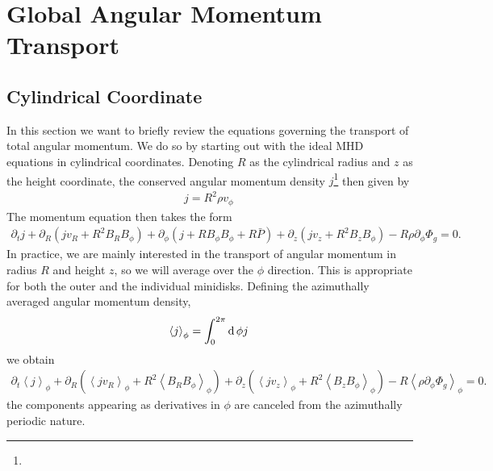 \documentclass[%
 reprint,
 superscriptaddress,
 amsmath,amssymb,
 nofootinbib,
 prd,
]{revtex4-2}
\newcommand{\hyw}[1]{{\color{red}{[{#1}]}}}
\begin{document}
\section{Global Angular Momentum Transport}
\label{app:amt}

\subsection{Cylindrical Coordinate}

In this section we want to briefly review the equations governing the transport of total angular momentum. We do so by starting out with the ideal MHD equations in cylindrical coordinates. Denoting %
$R$ as the cylindrical radius and $z$ as the height coordinate, the conserved angular momentum density $j$\footnote{\hyw{The specific angular momentum is $l=R v_\phi$. To have the conserved angular momentum in the radial direction, one need to do the integration along both azimuthal and vertical directions $\int R d\phi \int dz \rho l=\int d\phi \int dz (R^2 \rho v_\phi)$. So the conserved angular momentum current across different cylinders (having $R$ constant) has the form of $j=R^2 \rho v_\phi$}} then given by
\begin{align}
    j = R^2 \rho v_\phi\,
\end{align}
The momentum equation then takes the form
\begin{align}
    \partial_t j + \partial_R \left( j v_R + R^2 B_R B_\phi \right) + \partial_\phi \left( {j} + R B_\phi B_\phi + R \bar{P}\right) + \partial_z \left(j v_z  + R^2 B_z B_\phi\right) - R \rho \partial_\phi \Phi_g = 0.
\end{align}
In practice, we are mainly interested in the transport of angular momentum in radius $R$ and height $z$, so we will average over the $\phi$ direction. This is appropriate for both the outer and the individual minidisks.
Defining the azimuthally averaged angular momentum density,
\begin{align}
    \left<j\right>_\phi = \int_0^{2\pi}{\rm d}\, \phi j\,
\end{align}
we obtain
\begin{align}
\partial_t \left<j\right>_\phi + \partial_R \left( \left<j v_R \right>_\phi + R^2 \left<B_R B_\phi\right>_\phi \right) + \partial_z \left(\left< j v_z \right>_\phi + R^2 \left<B_z B_\phi \right>_\phi \right) - R \left<\rho \partial_\phi \Phi_g\right>_\phi = 0.
\end{align}
the components appearing as derivatives in $\phi$ are canceled from the azimuthally periodic nature.
\end{document}
